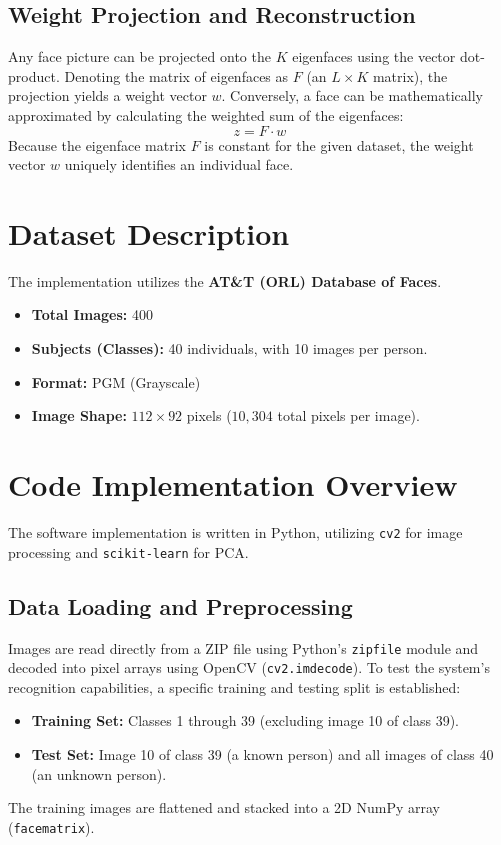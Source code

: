 \documentclass[12pt,a4paper]{article}
\begin{document}
\subsection{Weight Projection and Reconstruction}
Any face picture can be projected onto the $K$ eigenfaces using the vector dot-product. Denoting the matrix of eigenfaces as $F$ (an $L \times K$ matrix), the projection yields a weight vector $w$. 
Conversely, a face can be mathematically approximated by calculating the weighted sum of the eigenfaces:
\begin{equation}
z = F \cdot w
\end{equation}
Because the eigenface matrix $F$ is constant for the given dataset, the weight vector $w$ uniquely identifies an individual face. 

\section{Dataset Description}
The implementation utilizes the \textbf{AT\&T (ORL) Database of Faces}. 
\begin{itemize}
    \item \textbf{Total Images:} 400
    \item \textbf{Subjects (Classes):} 40 individuals, with 10 images per person.
    \item \textbf{Format:} PGM (Grayscale)
    \item \textbf{Image Shape:} $112 \times 92$ pixels ($10,304$ total pixels per image).
\end{itemize}

\section{Code Implementation Overview}
The software implementation is written in Python, utilizing \texttt{cv2} for image processing and \texttt{scikit-learn} for PCA. 

\subsection{Data Loading and Preprocessing}
Images are read directly from a ZIP file using Python's \texttt{zipfile} module and decoded into pixel arrays using OpenCV (\texttt{cv2.imdecode}). To test the system's recognition capabilities, a specific training and testing split is established:
\begin{itemize}
    \item \textbf{Training Set:} Classes 1 through 39 (excluding image 10 of class 39).
    \item \textbf{Test Set:} Image 10 of class 39 (a known person) and all images of class 40 (an unknown person).
\end{itemize}
The training images are flattened and stacked into a 2D NumPy array (\texttt{facematrix}).
\end{document}
